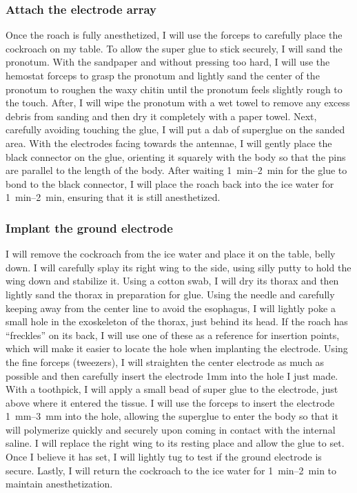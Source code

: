 \subsubsection{Attach the electrode array}
Once the roach is fully anesthetized, I will use the forceps to carefully place the cockroach on my table. To allow the super glue to stick securely, I will sand the pronotum. With the sandpaper and without pressing too hard, I will use the hemostat forceps to grasp the pronotum and lightly sand the center of the pronotum to roughen the waxy chitin until the pronotum feels slightly rough to the touch. After, I will wipe the pronotum with a wet towel to remove any excess debris from sanding and then dry it completely with a paper towel. Next, carefully avoiding touching the glue, I will put a dab of superglue on the sanded area. With the electrodes facing towards the antennae, I will gently place the black connector on the glue, orienting it squarely with the body so that the pins are parallel to the length of the body. After waiting \SIrange{1}{2}{\minute} for the glue to bond to the black connector, I will place the roach back into the ice water for \SIrange{1}{2}{\minute}, ensuring that it is still anesthetized.

\subsubsection{Implant the ground electrode}
I will remove the cockroach from the ice water and place it on the table, belly down. I will carefully splay its right wing to the side, using silly putty to hold the wing down and stabilize it. Using a cotton swab, I will dry its thorax and then lightly sand the thorax in preparation for glue. Using the needle and carefully keeping away from the center line to avoid the esophagus, I will lightly poke a small hole in the exoskeleton of the thorax, just behind its head. If the roach has ``freckles'' on its back, I will use one of these as a reference for insertion points, which will make it easier to locate the hole when implanting the electrode. Using the fine forceps (tweezers), I will straighten the center electrode as much as possible and then carefully insert the electrode 1mm into the hole I just made. With a toothpick, I will apply a small bead of super glue to the electrode, just above where it entered the tissue. I will use the forceps to insert the electrode \SIrange{1}{3}{\milli\meter} into the hole, allowing the superglue to enter the body so that it will polymerize quickly and securely upon coming in contact with the internal saline. I will replace the right wing to its resting place and allow the glue to set. Once I believe it has set, I will lightly tug to test if the ground electrode is secure. Lastly, I will return the cockroach to the ice water for \SIrange{1}{2}{\minute} to maintain anesthetization.

